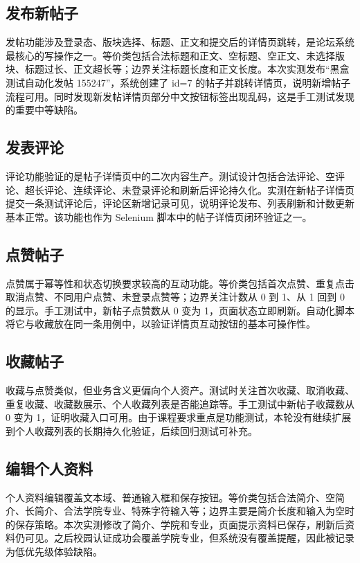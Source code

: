 \documentclass[bwprint]{report}
\begin{document}
\subsection{发布新帖子}
发帖功能涉及登录态、版块选择、标题、正文和提交后的详情页跳转，是论坛系统最核心的写操作之一。等价类包括合法标题和正文、空标题、空正文、未选择版块、标题过长、正文超长等；边界关注标题长度和正文长度。本次实测发布“黑盒测试自动化发帖 155247”，系统创建了 id=7 的帖子并跳转详情页，说明新增帖子流程可用。同时发现新发帖详情页部分中文按钮标签出现乱码，这是手工测试发现的重要中等缺陷。

\subsection{发表评论}
评论功能验证的是帖子详情页中的二次内容生产。测试设计包括合法评论、空评论、超长评论、连续评论、未登录评论和刷新后评论持久化。实测在新帖子详情页提交一条测试评论后，评论区新增记录可见，说明评论发布、列表刷新和计数更新基本正常。该功能也作为 Selenium 脚本中的帖子详情页闭环验证之一。

\subsection{点赞帖子}
点赞属于幂等性和状态切换要求较高的互动功能。等价类包括首次点赞、重复点击取消点赞、不同用户点赞、未登录点赞等；边界关注计数从 0 到 1、从 1 回到 0 的显示。手工测试中，新帖子点赞数从 0 变为 1，页面状态立即刷新。自动化脚本将它与收藏放在同一条用例中，以验证详情页互动按钮的基本可操作性。

\subsection{收藏帖子}
收藏与点赞类似，但业务含义更偏向个人资产。测试时关注首次收藏、取消收藏、重复收藏、收藏数展示、个人收藏列表是否能追踪等。手工测试中新帖子收藏数从 0 变为 1，证明收藏入口可用。由于课程要求重点是功能测试，本轮没有继续扩展到个人收藏列表的长期持久化验证，后续回归测试可补充。

\subsection{编辑个人资料}
个人资料编辑覆盖文本域、普通输入框和保存按钮。等价类包括合法简介、空简介、长简介、合法学院专业、特殊字符输入等；边界主要是简介长度和输入为空时的保存策略。本次实测修改了简介、学院和专业，页面提示资料已保存，刷新后资料仍可见。之后校园认证成功会覆盖学院专业，但系统没有覆盖提醒，因此被记录为低优先级体验缺陷。
\end{document}
